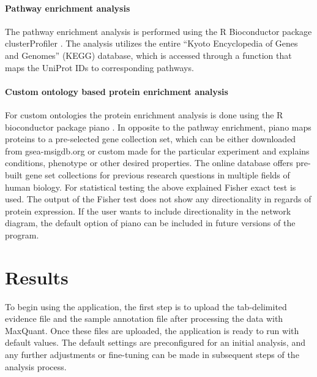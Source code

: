 \documentclass[
  11pt,
]{article}
\begin{document}
\hypertarget{pathway-enrichment-analysis}{%
\paragraph{Pathway enrichment analysis}\label{pathway-enrichment-analysis}}

The pathway enrichment analysis is performed using the R Bioconductor package clusterProfiler \citep{Wu2021}. The analysis utilizes the entire ``Kyoto Encyclopedia of Genes and Genomes'' (KEGG) database, which is accessed through a function that maps the UniProt IDs to corresponding pathways.

\hypertarget{custom-ontology-based-protein-enrichment-analysis}{%
\paragraph{Custom ontology based protein enrichment analysis}\label{custom-ontology-based-protein-enrichment-analysis}}

For custom ontologies the protein enrichment analysis is done using the R bioconductor package piano \citep{Vaeremo2013}. In opposite to the pathway enrichment, piano maps proteins to a pre-selected gene collection set, which can be either downloaded from gsea-msigdb.org or custom made for the particular experiment and explains conditions, phenotype or other desired properties. The online database offers pre-built gene set collections for previous research questions in multiple fields of human biology.
For statistical testing the above explained Fisher exact test is used. The output of the Fisher test does not show any directionality in regards of protein expression. If the user wants to include directionality in the network diagram, the default option of piano can be included in future versions of the program.

\newpage

\hypertarget{results}{%
\section{Results}\label{results}}

To begin using the application, the first step is to upload the tab-delimited evidence file and the sample annotation file after processing the data with MaxQuant. Once these files are uploaded, the application is ready to run with default values. The default settings are preconfigured for an initial analysis, and any further adjustments or fine-tuning can be made in subsequent steps of the analysis process.
\end{document}
